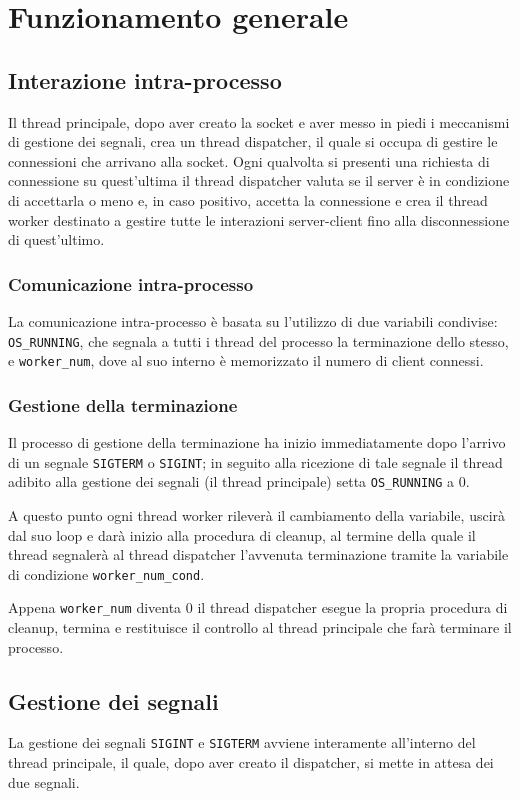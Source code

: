 \documentclass[a4paper,11pt]{article}
\begin{document}
\section{Funzionamento generale}
\subsection{Interazione intra-processo}
Il thread principale, dopo aver creato la socket e aver messo in piedi i meccanismi di gestione dei segnali, crea un thread dispatcher, il quale
si occupa di gestire le connessioni che arrivano alla socket. Ogni qualvolta si presenti una richiesta di connessione su quest'ultima il thread dispatcher
valuta se il server è in condizione di accettarla o meno e, in caso positivo, accetta la connessione e crea il thread worker destinato a gestire tutte le interazioni server-client fino
alla disconnessione di quest'ultimo.
\subsubsection{Comunicazione intra-processo}
La comunicazione intra-processo è basata su l'utilizzo di due variabili condivise: \texttt{OS\_RUNNING}, che segnala a tutti i thread del processo la terminazione
dello stesso, e \texttt{worker\_num}, dove al suo interno è memorizzato il numero di client connessi.
\subsubsection{Gestione della terminazione}
Il processo di gestione della terminazione ha inizio immediatamente dopo l'arrivo di un segnale \texttt{SIGTERM} o \texttt{SIGINT}; in seguito alla ricezione di tale segnale
il thread adibito alla gestione dei segnali (il thread principale) setta \texttt{OS\_RUNNING} a 0.

A questo punto ogni thread worker rileverà il cambiamento della variabile, uscirà dal suo loop e darà inizio alla procedura di cleanup,
al termine della quale il thread segnalerà al thread dispatcher l'avvenuta terminazione tramite la variabile di condizione \texttt{worker\_num\_cond}.

Appena \texttt{worker\_num} diventa 0 il thread dispatcher esegue la propria procedura di cleanup, termina e restituisce il controllo al thread principale che farà terminare il processo.
\subsection{Gestione dei segnali}
La gestione dei segnali \texttt{SIGINT} e \texttt{SIGTERM} avviene interamente all'interno del thread principale, il quale, dopo aver creato il dispatcher, si mette in attesa dei due segnali.
\end{document}
